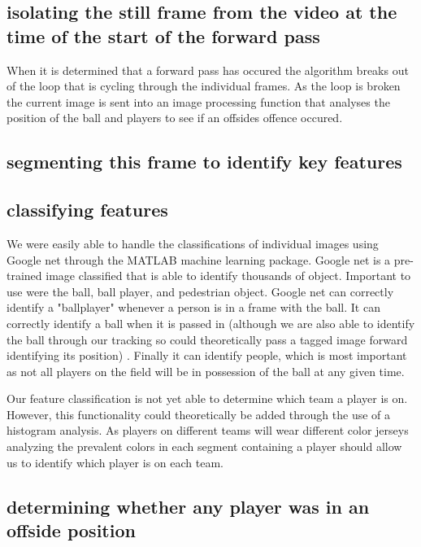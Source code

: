 \documentclass[letterpaper, 10 pt, conference]{ieeeconf}  %
\begin{document}
\subsection{isolating the still frame from the video at the time of the start of the forward pass}

When it is determined that a forward pass has occured the algorithm breaks out of the loop that is cycling through the individual frames. As the loop is broken the current image is sent into an image processing function that analyses the position of the ball and players to see if an offsides offence occured. 

\subsection{segmenting this frame to identify key features}

\subsection{classifying features}

We were easily able to handle the classifications of individual images using Google net through the MATLAB machine learning package. Google net is a pre-trained image classified that is able to identify thousands of object. Important to use were the ball, ball player, and pedestrian object. Google net can correctly identify a "ballplayer" whenever a person is in a frame with the ball. It can correctly identify a ball when it is passed in (although we are also able to identify the ball through our tracking so could theoretically pass a tagged image forward identifying its position) . Finally it can identify people, which is most important as not all players on the field will be in possession of the ball at any given time. 

Our feature classification is not yet able to determine which team a player is on. However, this functionality could theoretically be added through the use of a histogram analysis. As players on different teams will wear different color jerseys analyzing the prevalent colors in each segment containing a player should allow us to identify which player is on each team. 

\subsection{determining whether any player was in an offside position}
\end{document}
